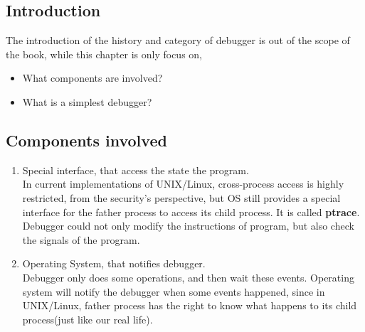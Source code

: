 \documentclass[12pt]{book}
\begin{document}
\begin{CJK}{UTF8}{gbsn}
\maketitle



\frontmatter


\tableofcontents

\mainmatter


\chapter{Introduction}
\label{chap:introduction}
The introduction of the history and category of debugger is out of the 
scope of the book, while this chapter is only focus on,
\begin{itemize}
\item What components are involved?
\item What is a simplest debugger?
\end{itemize}

\section{Components involved}

\begin{enumerate}
\item Special interface, that access the state the program. \\
  In current implementations of UNIX/Linux, cross-process access is highly 
restricted, from the security's perspective, but OS still provides
  a special interface for the father process to access its child process. 
It is called \textbf{ptrace}.  Debugger could not only modify the instructions of program,
  but also check the signals of the program.
\item Operating System, that notifies debugger. \\
  Debugger only does some operations, and then wait these events.  Operating 
system will notify the debugger when some events happened, 
  since in UNIX/Linux, father process has the right to know what happens to 
its child process(just like our real life).
\end{enumerate}


\end{CJK}
\end{document}
